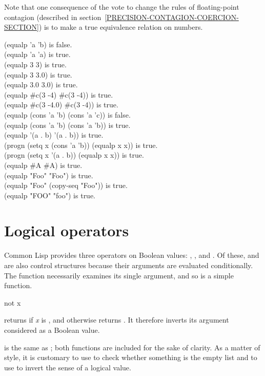 \begin{defun}[Function]
\begin{new}
Note that one consequence
of the vote to change the rules of
floating-point contagion
(described in section~\ref{PRECISION-CONTAGION-COERCION-SECTION})
is to make 
a true equivalence relation on numbers.
\end{new}

\begin{lisp}
(equalp 'a 'b) \textrm{is false.} \\
(equalp 'a 'a) \textrm{is true.} \\
(equalp 3 3) \textrm{is true.} \\
(equalp 3 3.0) \textrm{is true.} \\
(equalp 3.0 3.0) \textrm{is true.} \\
(equalp \#c(3 -4) \#c(3 -4)) \textrm{is true.} \\
(equalp \#c(3 -4.0) \#c(3 -4)) \textrm{is true.} \\
(equalp (cons 'a 'b) (cons 'a 'c)) \textrm{is false.} \\
(equalp (cons 'a 'b) (cons 'a 'b)) \textrm{is true.} \\
(equalp '(a . b) '(a . b)) \textrm{is true.} \\
(progn (setq x (cons 'a 'b)) (equalp x x)) \textrm{is true.} \\
(progn (setq x '(a . b)) (equalp x x)) \textrm{is true.} \\
(equalp \#{\Xbackslash}A \#{\Xbackslash}A) \textrm{is true.} \\
(equalp "Foo" "Foo") \textrm{is true.} \\
(equalp "Foo" (copy-seq "Foo")) \textrm{is true.} \\
(equalp "FOO" "foo") \textrm{is true.}
\end{lisp}

\end{defun}

\section{Logical operators}

Common Lisp provides three operators on Boolean values: , ,
and .  Of these,  and 
are also control structures because their arguments are evaluated
conditionally.
The function  necessarily examines its single argument, and so
is a simple function.

\begin{defun}[Function]
not x

 returns {\true} if \emph{x} is {\false}, and otherwise returns {\false}.
It therefore inverts its argument considered as a Boolean value.

 is the same as ; both functions are included for the sake
of clarity.  As a matter of style,
it is customary to use  to check whether something is the empty list
and to use  to invert the sense of a logical value.
\end{defun}

